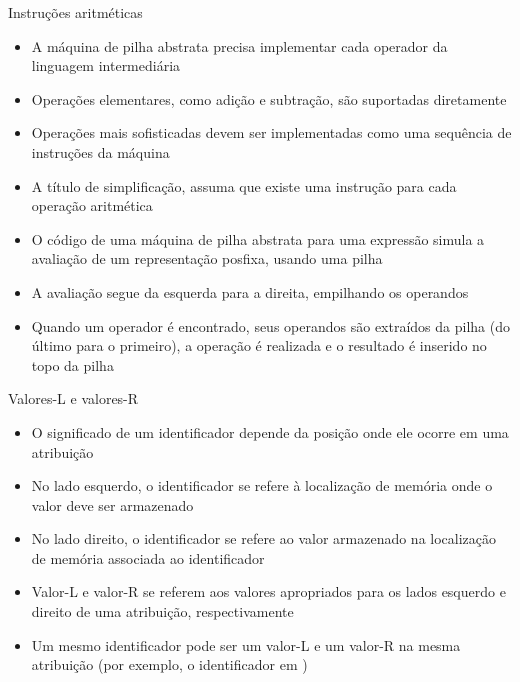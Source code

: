 \begin{frame}[fragile]{Instruções aritméticas}

    \begin{itemize}
        \item  A máquina de pilha abstrata precisa implementar cada operador da linguagem intermediária

        \item Operações elementares, como adição e subtração, são suportadas diretamente

        \item Operações mais sofisticadas devem ser implementadas como uma sequência de instruções da máquina

        \item A título de simplificação, assuma que existe uma instrução para cada operação aritmética

        \item O código de uma máquina de pilha abstrata para uma expressão simula a avaliação de um representação posfixa, usando uma pilha

        \item A avaliação segue da esquerda para a direita, empilhando os operandos

        \item  Quando um operador é encontrado, seus operandos são extraídos da pilha
        (do último para o primeiro), a operação é realizada e o resultado é inserido no topo da pilha
    \end{itemize}

\end{frame}



\begin{frame}[fragile]{Valores-L e valores-R}

    \begin{itemize}
        \item O significado de um identificador depende da posição onde ele ocorre em uma atribuição

        \item No lado esquerdo, o identificador se refere à localização de memória onde o valor deve ser armazenado

        \item No lado direito, o identificador se refere ao valor armazenado na localização de memória associada ao identificador

        \item Valor-L e valor-R se referem aos valores apropriados para os lados esquerdo e direito de uma atribuição, respectivamente

        \item Um mesmo identificador pode ser um valor-L e um valor-R na mesma atribuição (por exemplo, o identificador  em )
    \end{itemize}

\end{frame}


